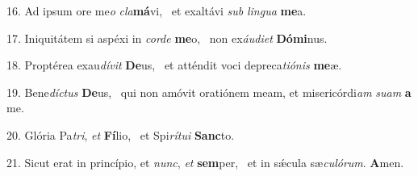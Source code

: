 16. Ad ipsum ore me\textit{o} \textit{cla}\textbf{má}vi, \ast\  et exaltávi \textit{sub} \textit{lin}\textit{gua} \textbf{me}a.\

17. Iniquitátem si aspéxi in \textit{cor}\textit{de} \textbf{me}o, \ast\  non ex\textit{áu}\textit{di}\textit{et} \textbf{Dó}\textbf{mi}nus.\

18. Proptérea exau\textit{dí}\textit{vit} \textbf{De}us, \ast\  et atténdit voci depreca\textit{ti}\textit{ó}\textit{nis} \textbf{me}æ.\

19. Bene\textit{díc}\textit{tus} \textbf{De}us, \ast\  qui non amóvit oratiónem meam, et misericórdi\textit{am} \textit{su}\textit{am} \textbf{a} me.\

20. Glória Pa\textit{tri}, \textit{et} \textbf{Fí}lio, \ast\  et Spi\textit{rí}\textit{tu}\textit{i} \textbf{Sanc}to.\

21. Sicut erat in princípio, et \textit{nunc}, \textit{et} \textbf{sem}per, \ast\  et in sǽcula sæ\textit{cu}\textit{ló}\textit{rum}. \textbf{A}men.\

